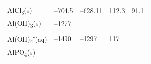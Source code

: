 \documentclass[
  9pt,
]{extbook}
\theoremstyle{definition}
\theoremstyle{definition}
\theoremstyle{definition}
\theoremstyle{remark}
\begin{document}
\begin{longtable}[]{@{}lllll@{}}
\begin{minipage}[t]{0.10\columnwidth}
AlCl\textsubscript{3}(s)\strut
\end{minipage} & \begin{minipage}[t]{0.19\columnwidth}\raggedright
--704.5\strut
\end{minipage} & \begin{minipage}[t]{0.20\columnwidth}\raggedright
--628.11\strut
\end{minipage} & \begin{minipage}[t]{0.18\columnwidth}\raggedright
112.3\strut
\end{minipage} & \begin{minipage}[t]{0.18\columnwidth}\raggedright
91.1\strut
\end{minipage}\tabularnewline
\begin{minipage}[t]{0.10\columnwidth}\raggedright
Al(OH)\textsubscript{3}(s)\strut
\end{minipage} & \begin{minipage}[t]{0.19\columnwidth}\raggedright
--1277\strut
\end{minipage} & \begin{minipage}[t]{0.20\columnwidth}\raggedright
\strut
\end{minipage} & \begin{minipage}[t]{0.18\columnwidth}\raggedright
\strut
\end{minipage} & \begin{minipage}[t]{0.18\columnwidth}\raggedright
\strut
\end{minipage}\tabularnewline
\begin{minipage}[t]{0.10\columnwidth}\raggedright
Al(OH)\textsubscript{4}\textsuperscript{-}(aq)\strut
\end{minipage} & \begin{minipage}[t]{0.19\columnwidth}\raggedright
--1490\strut
\end{minipage} & \begin{minipage}[t]{0.20\columnwidth}\raggedright
--1297\strut
\end{minipage} & \begin{minipage}[t]{0.18\columnwidth}\raggedright
117\strut
\end{minipage} & \begin{minipage}[t]{0.18\columnwidth}\raggedright
\strut
\end{minipage}\tabularnewline
\begin{minipage}[t]{0.10\columnwidth}\raggedright
AlPO\textsubscript{4}(s)\strut
\end{minipage} & \begin{minipage}[t]{0.19\columnwidth}\raggedright

\end{minipage}
\end{longtable}
\end{document}
